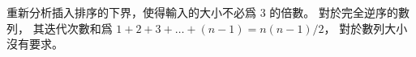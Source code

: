 \startEXERCISE
重新分析插入排序的下界，使得輸入的大小不必爲 $3$ 的倍數。
\stopEXERCISE
\startANSWER
對於完全逆序的數列，
其迭代次數和爲 $1+2+3+\dots+(n-1)=n (n-1)/2$，
對於數列大小沒有要求。
\stopANSWER
